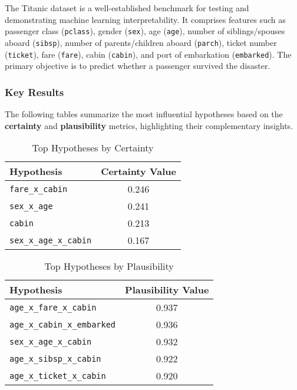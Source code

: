 \documentclass[acmlarge]{acmart}
\begin{document}
The Titanic dataset is a well-established benchmark for testing and demonstrating machine learning interpretability. It comprises features such as passenger class (\texttt{pclass}), gender (\texttt{sex}), age (\texttt{age}), number of siblings/spouses aboard (\texttt{sibsp}), number of parents/children aboard (\texttt{parch}), ticket number (\texttt{ticket}), fare (\texttt{fare}), cabin (\texttt{cabin}), and port of embarkation (\texttt{embarked}). The primary objective is to predict whether a passenger survived the disaster.


\subsubsection{Key Results}

The following tables summarize the most influential hypotheses based on the \textbf{certainty} and \textbf{plausibility} metrics, highlighting their complementary insights.

\begin{table}[H]
    \caption{Top Hypotheses by Certainty}
    \label{tab:top_certainty}
    \centering
    \begin{tabular}{|l|c|}
        \hline
        \textbf{Hypothesis} & \textbf{Certainty Value} \\
        \hline
        \texttt{fare\_x\_cabin} & 0.246 \\
        \texttt{sex\_x\_age} & 0.241 \\
        \texttt{cabin} & 0.213 \\
        \texttt{sex\_x\_age\_x\_cabin} & 0.167 \\
        \hline
    \end{tabular}
\end{table}

\begin{table}[H]
    \caption{Top Hypotheses by Plausibility}
    \label{tab:top_plausibility}
    \centering
    \begin{tabular}{|l|c|}
        \hline
        \textbf{Hypothesis} & \textbf{Plausibility Value} \\
        \hline
        \texttt{age\_x\_fare\_x\_cabin} & 0.937 \\
        \texttt{age\_x\_cabin\_x\_embarked} & 0.936 \\
        \texttt{sex\_x\_age\_x\_cabin} & 0.932 \\
        \texttt{age\_x\_sibsp\_x\_cabin} & 0.922 \\
        \texttt{age\_x\_ticket\_x\_cabin} & 0.920 \\
        \hline
    \end{tabular}
\end{table}
\end{document}
